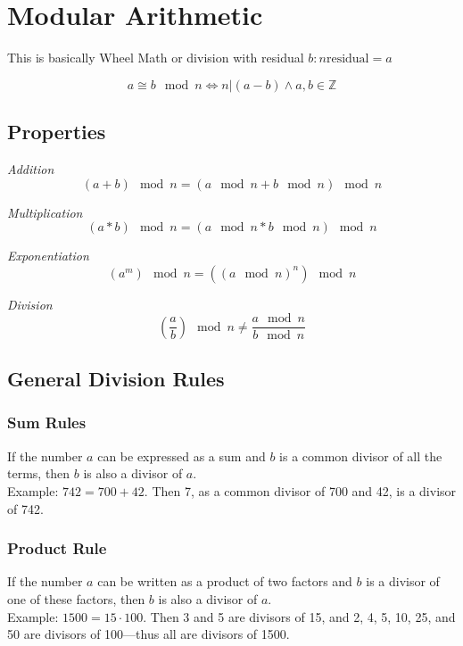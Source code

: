 \section{Modular Arithmetic}

This is basically Wheel Math or division with residual \(b : n \text{residual} = a\)

\[a \cong b \mod n \iff n | (a - b) \land  a,b \in \mathbb{Z}\]

\subsection{Properties}

\emph{Addition}
\[(a + b) \mod n = (a \mod n + b \mod n) \mod n\]

\emph{Multiplication}
\[(a * b) \mod n = (a \mod n * b \mod n) \mod n\]

\emph{Exponentiation}
\[(a^m) \mod n = ((a \mod n)^n) \mod n\]

\emph{Division}
\[(\frac{a}{b}) \mod n \ne  \frac{a \mod n}{b \mod n}\]

\subsection{General Division Rules}

\subsubsection*{Sum Rules}

If the number \( a \) can be expressed as a sum and \( b \) is a common divisor of all the terms, then \( b \) is also a divisor of \( a \). \\
 Example: \( 742 = 700 + 42 \). Then 7, as a common divisor of 700 and 42, is a divisor of 742.

\subsubsection*{Product Rule}

If the number \( a \) can be written as a product of two factors and \( b \) is a divisor of one of these factors, then \( b \) is also a divisor of \( a \). \\
Example: \( 1500 = 15 \cdot 100 \). Then 3 and 5 are divisors of 15, and 2, 4, 5, 10, 25, and 50 are divisors of 100—thus all are divisors of 1500.


